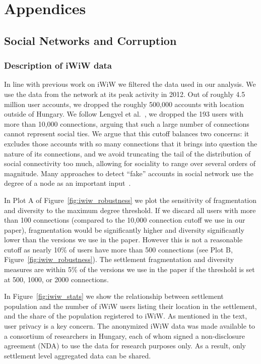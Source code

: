 \chapter{Appendices}

\section{Social Networks and Corruption}

\subsection{Description of iWiW data}
\label{SI:iwiwappendix}
In line with previous work on iWiW we filtered the data used in our analysis. We use the data from the network at its peak activity in 2012. Out of roughly 4.5 million user accounts, we dropped the roughly 500,000 accounts with location outside of Hungary. We follow Lengyel et al.~\cite{lengyel2015geographies}, we dropped the 193 users with more than 10,000 connections, arguing that such a large number of connections cannot represent social ties. We argue that this cutoff balances two concerns: it excludes those accounts with so many connections that it brings into question the nature of its connections, and we avoid truncating the tail of the distribution of social connectivity too much, allowing for sociality to range over several orders of magnitude. Many approaches to detect ``fake'' accounts in social network use the degree of a node as an important input~\cite{cao2012aiding}. 

In Plot A of Figure~\ref{fig:iwiw_robustness} we plot the sensitivity of fragmentation and diversity to the maximum degree threshold. If we discard all users with more than 100 connections (compared to the 10,000 connection cutoff we use in our paper), fragmentation would be significantly higher and diversity significantly lower than the versions we use in the paper. However this is not a reasonable cutoff as nearly 10\% of users have more than 500 connections (see Plot B, Figure~\ref{fig:iwiw_robustness}). The settlement fragmentation and diversity measures are within 5\% of the versions we use in the paper if the threshold is set at 500, 1000, or 2000 connections.  



In Figure~\ref{fig:iwiw_stats} we show the relationship between settlement population and the number of iWiW users listing their location in the settlement, and the share of the population registered to iWiW. As mentioned in the text, user privacy is a key concern. The anonymized iWiW data was made available to a consortium of researchers in Hungary, each of whom signed a non-disclosure agreement (NDA) to use the data for research purposes only. As a result, only settlement level aggregated data can be shared. 

